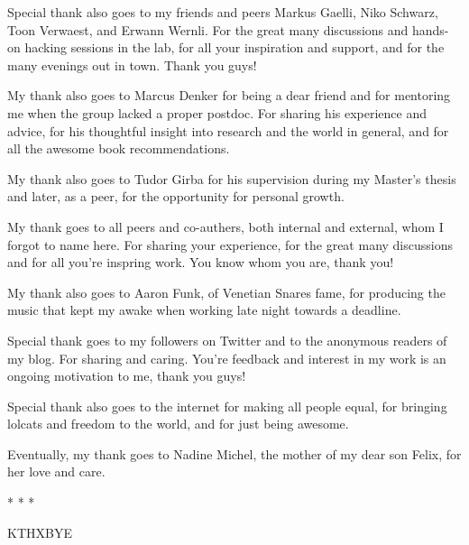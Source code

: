 Special thank also goes to my friends and peers Markus Gaelli, Niko Schwarz, Toon Verwaest, and Erwann Wernli. For the great many discussions and hands-on hacking sessions in the lab, for all your inspiration and support, and for the many evenings out in town.  Thank you guys!

My thank also goes to Marcus Denker for being a dear friend and for mentoring me when the group lacked a proper postdoc. For sharing his experience and advice, for his thoughtful insight into research and the world in general, and for all the awesome book recommendations. 

My thank also goes to Tudor Girba for his supervision during my Master's thesis and later, as a peer, for the opportunity for personal growth.

My thank goes to all peers and co-authers, both internal and external, whom I forgot to name here. For sharing your experience, for the great many discussions and for all you're inspring work. You know whom you are, thank you!

My thank also goes to Aaron Funk, of Venetian Snares fame, for producing the music that kept my awake when working late night towards a deadline. 

Special thank goes to my followers on Twitter and to the anonymous readers of my blog. For sharing and caring. You're feedback and interest in my work is an ongoing motivation to me, thank you guys!

Special thank also goes to the internet for making all people equal, for bringing lolcats and freedom to the world, and for just being awesome.

Eventually, my thank goes to Nadine Michel, the mother of my dear son Felix, for her love and care. 

\begin{center}* * *\end{center}

KTHXBYE
